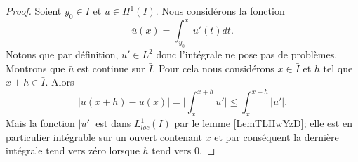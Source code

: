 \begin{proof}
    Soient \( y_0\in I\) et \( u\in H^1(I)\). Nous considérons la fonction
    \begin{equation}
        \bar u(x)=\int_{y_0}^xu'(t)dt.
    \end{equation}
    Notons que par définition, \( u'\in L^2\) donc l'intégrale ne pose pas de problèmes. Montrons que \( \bar u\) est continue sur \( \bar I\). Pour cela nous considérons \( x\in\bar I\) et \( h\) tel que \( x+h\in \bar I\). Alors
    \begin{equation}
        \big| \bar u(x+h)-\bar u(x) \big|=\big| \int_x^{x+h}u' \big|\leq \int_x^{x+h}| u' |.
    \end{equation}
    Mais la fonction \( | u' |\) est dans \( L^1_{loc}(I)\) par le lemme \ref{LemTLHwYzD}; elle est en particulier intégrable sur un ouvert contenant \( x\) et par conséquent la dernière intégrale tend vers zéro lorsque \( h\) tend vers \( 0\).


\end{proof}
